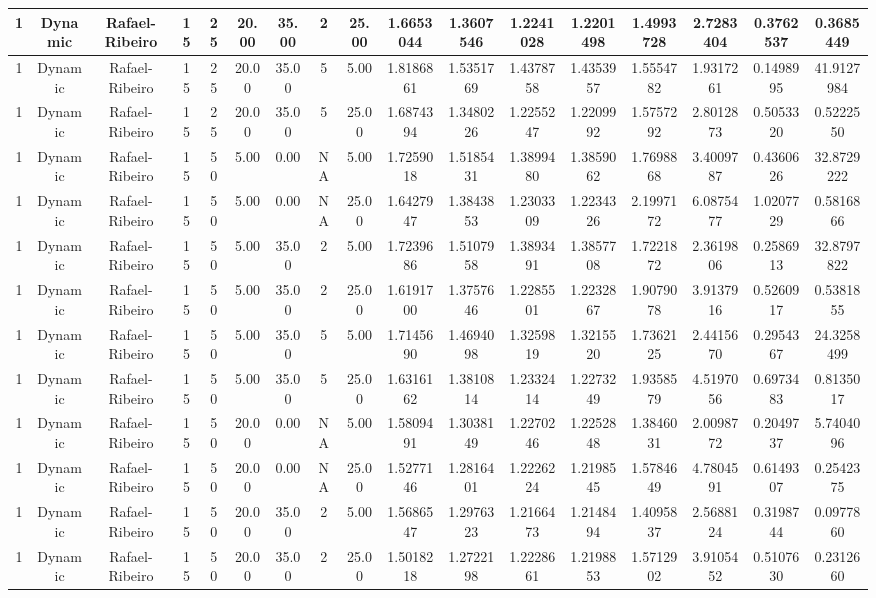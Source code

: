 \begin{longtable}{ | c | c | c | c | c | c | c | c | c | c | c | c | c | c | c | c | c | }
	\hline
	1	&	Dynamic	&	Rafael-Ribeiro	&	15	&	25	&	20.00	&	35.00	&	2	&	25.00	&	1.6653044	&	1.3607546	&	1.2241028	&	1.2201498	&	1.4993728	&	2.7283404	&	0.3762537	&	0.3685449 \\
	\hline
	1	&	Dynamic	&	Rafael-Ribeiro	&	15	&	25	&	20.00	&	35.00	&	5	&	5.00	&	1.8186861	&	1.5351769	&	1.4378758	&	1.4353957	&	1.5554782	&	1.9317261	&	0.1498995	&	41.9127984 \\
	\hline
	1	&	Dynamic	&	Rafael-Ribeiro	&	15	&	25	&	20.00	&	35.00	&	5	&	25.00	&	1.6874394	&	1.3480226	&	1.2255247	&	1.2209992	&	1.5757292	&	2.8012873	&	0.5053320	&	0.5222550 \\
	\hline
	1	&	Dynamic	&	Rafael-Ribeiro	&	15	&	50	&	5.00	&	0.00	&	NA	&	5.00	&	1.7259018	&	1.5185431	&	1.3899480	&	1.3859062	&	1.7698868	&	3.4009787	&	0.4360626	&	32.8729222 \\
	\hline
	1	&	Dynamic	&	Rafael-Ribeiro	&	15	&	50	&	5.00	&	0.00	&	NA	&	25.00	&	1.6427947	&	1.3843853	&	1.2303309	&	1.2234326	&	2.1997172	&	6.0875477	&	1.0207729	&	0.5816866 \\
	\hline
	1	&	Dynamic	&	Rafael-Ribeiro	&	15	&	50	&	5.00	&	35.00	&	2	&	5.00	&	1.7239686	&	1.5107958	&	1.3893491	&	1.3857708	&	1.7221872	&	2.3619806	&	0.2586913	&	32.8797822 \\
	\hline
	1	&	Dynamic	&	Rafael-Ribeiro	&	15	&	50	&	5.00	&	35.00	&	2	&	25.00	&	1.6191700	&	1.3757646	&	1.2285501	&	1.2232867	&	1.9079078	&	3.9137916	&	0.5260917	&	0.5381855 \\
	\hline
	1	&	Dynamic	&	Rafael-Ribeiro	&	15	&	50	&	5.00	&	35.00	&	5	&	5.00	&	1.7145690	&	1.4694098	&	1.3259819	&	1.3215520	&	1.7362125	&	2.4415670	&	0.2954367	&	24.3258499 \\
	\hline
	1	&	Dynamic	&	Rafael-Ribeiro	&	15	&	50	&	5.00	&	35.00	&	5	&	25.00	&	1.6316162	&	1.3810814	&	1.2332414	&	1.2273249	&	1.9358579	&	4.5197056	&	0.6973483	&	0.8135017 \\
	\hline
	1	&	Dynamic	&	Rafael-Ribeiro	&	15	&	50	&	20.00	&	0.00	&	NA	&	5.00	&	1.5809491	&	1.3038149	&	1.2270246	&	1.2252848	&	1.3846031	&	2.0098772	&	0.2049737	&	5.7404096 \\
	\hline
	1	&	Dynamic	&	Rafael-Ribeiro	&	15	&	50	&	20.00	&	0.00	&	NA	&	25.00	&	1.5277146	&	1.2816401	&	1.2226224	&	1.2198545	&	1.5784649	&	4.7804591	&	0.6149307	&	0.2542375 \\
	\hline
	1	&	Dynamic	&	Rafael-Ribeiro	&	15	&	50	&	20.00	&	35.00	&	2	&	5.00	&	1.5686547	&	1.2976323	&	1.2166473	&	1.2148494	&	1.4095837	&	2.5688124	&	0.3198744	&	0.0977860 \\
	\hline
	1	&	Dynamic	&	Rafael-Ribeiro	&	15	&	50	&	20.00	&	35.00	&	2	&	25.00	&	1.5018218	&	1.2722198	&	1.2228661	&	1.2198853	&	1.5712902	&	3.9105452	&	0.5107630	&	0.2312660 \\

\end{longtable}

